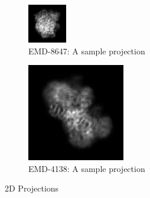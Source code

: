\documentclass[twoside]{iitbreport}
\begin{document}
\begin{figure}[h]
\centering
\begin{subfigure}{.5\textwidth}
\centering
\includegraphics[width=0.8\linewidth]{Emd_8647_proj1.jpg}
\captionsetup{justification=centering}
\caption{ EMD-8647: A sample projection }
\label{subfg:emd_8647_proj1}
\end{subfigure} 
\begin{subfigure}{.48\textwidth}
\centering
\includegraphics[width=0.8\linewidth]{Emd_4138_proj_1.jpg}
\captionsetup{justification=centering}
\caption{ EMD-4138: A sample projection}
\label{subfg:emd_4138_proj1}
\end{subfigure}
\caption{2D Projections}
\label{fig:Emdb-2D-projections}
\end{figure}
\end{document}
